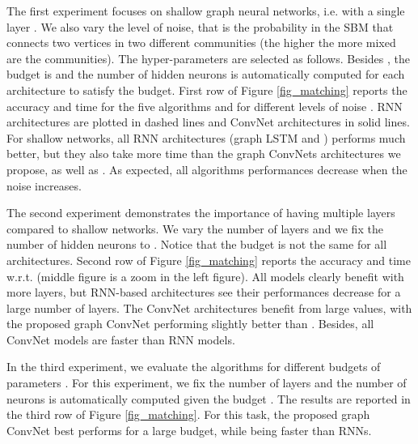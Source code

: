 \documentclass{article} \usepackage{iclr2018_conference,times}
\begin{document}
The first experiment focuses on shallow graph neural networks, i.e. with a single layer . We also vary the level of noise, that is the probability  in the SBM that connects two vertices in two different communities (the higher  the more mixed are the communities). The hyper-parameters are selected as follows. Besides , the budget is  and the number of hidden neurons  is automatically computed for each architecture to satisfy the budget. First row of Figure \ref{fig_matching} reports the accuracy and time for the five algorithms and for different levels of noise . RNN architectures are plotted in dashed lines and ConvNet architectures in solid lines. For shallow networks, all RNN architectures (graph LSTM and  \cite{art:LiTarlowBrockschmidtZemel16GNN}) performs much better, but they also take more time than the graph ConvNets architectures we propose, as well as  \cite{art:SukhbaatarSzlamFergus16ComAgents,marcheggiani2017encoding}. As expected, all algorithms performances decrease when the noise increases.



The second experiment demonstrates the importance of having multiple layers compared to shallow networks. We vary the number of layers  and we fix the number of hidden neurons to . Notice that the budget is not the same for all architectures. Second row of Figure \ref{fig_matching} reports the accuracy and time w.r.t.  (middle figure is a zoom in the left figure). All models clearly benefit with more layers, but RNN-based architectures see their performances decrease for a large number of layers. The ConvNet architectures benefit from large  values, with the proposed graph ConvNet performing slightly better than \cite{art:SukhbaatarSzlamFergus16ComAgents,marcheggiani2017encoding}. Besides, all ConvNet models are faster than RNN models.





In the third experiment, we evaluate the algorithms for different budgets of parameters . For this experiment, we fix the number of layers  and the number of neurons  is automatically computed given the budget .  The results are reported in the third row of Figure \ref{fig_matching}. For this task, the proposed graph ConvNet best performs for a large budget, while being faster than RNNs.
\end{document}
